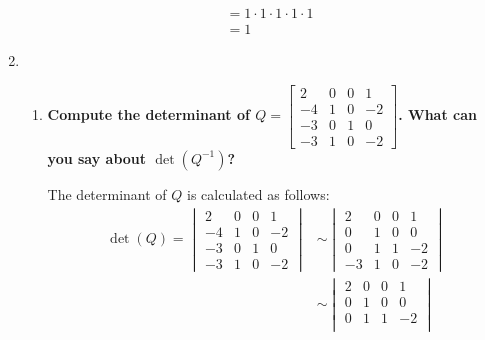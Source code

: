 \documentclass[11pt]{article}
\begin{document}
\begin{enumerate}[label=\textbf{\arabic*.}]
{\begin{enumerate}[label=\textbf{(\alph*)}]
{\begin{align*}
                                & =1\cdot1\cdot1\cdot1\cdot1                     \\
                                & =1
                    \end{align*}
                    }
          \end{enumerate}
          }
          \pagebreak
    \item{
          \begin{enumerate}[label=\textbf{(\alph*)}]
              \item{
                    \textbf{\boldmath Compute the determinant of $Q=\begin{bmatrix}2 & 0 & 0 & 1 \\ -4 & 1 & 0 & -2 \\ -3 & 0 & 1 & 0 \\ -3 & 1 & 0 & -2\end{bmatrix}$. What can you say about $\det(Q^{-1})$?}
                    \par
                    The determinant of $Q$ is calculated as follows:
                    \begin{align*}
                        \det(Q)=
                        \begin{vmatrix}
                            2  & 0 & 0 & 1  \\
                            -4 & 1 & 0 & -2 \\
                            -3 & 0 & 1 & 0  \\
                            -3 & 1 & 0 & -2
                        \end{vmatrix}
                         & \sim
                        \begin{vmatrix}
                            2  & 0 & 0 & 1  \\
                            0  & 1 & 0 & 0  \\
                            0  & 1 & 1 & -2 \\
                            -3 & 1 & 0 & -2
                        \end{vmatrix}             \\
                         & \sim
                        \begin{vmatrix}
                            2 & 0 & 0 & 1            \\
                            0 & 1 & 0 & 0            \\
                            0 & 1 & 1 & -2           \\

\end{vmatrix}
\end{align*}}
\end{enumerate}}
\end{enumerate}
\end{document}
